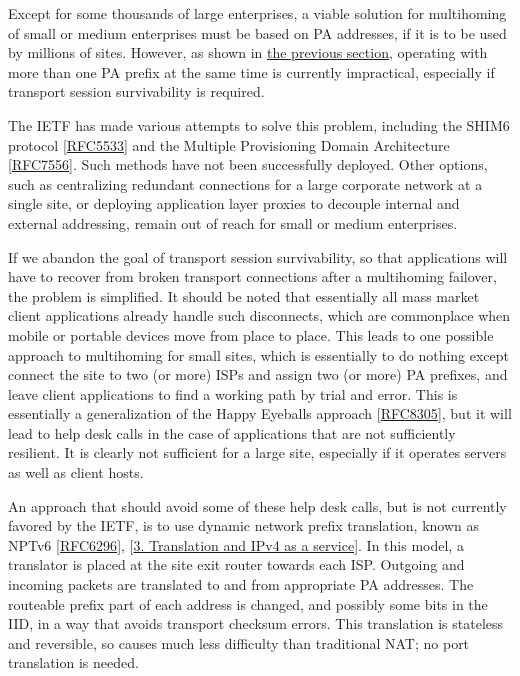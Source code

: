 \documentclass[
]{article}
\begin{document}
Except for some thousands of large enterprises, a viable solution for
multihoming of small or medium enterprises must be based on PA
addresses, if it is to be used by millions of sites. However, as shown
in \hyperref[multi-prefix-operation]{the previous section}, operating
with more than one PA prefix at the same time is currently impractical,
especially if transport session survivability is required.

The IETF has made various attempts to solve this problem, including the
SHIM6 protocol
{[}\href{https://www.rfc-editor.org/info/rfc5533}{RFC5533}{]} and the
Multiple Provisioning Domain Architecture
{[}\href{https://www.rfc-editor.org/info/rfc7556}{RFC7556}{]}. Such
methods have not been successfully deployed. Other options, such as
centralizing redundant connections for a large corporate network at a
single site, or deploying application layer proxies to decouple internal
and external addressing, remain out of reach for small or medium
enterprises.

If we abandon the goal of transport session survivability, so that
applications will have to recover from broken transport connections
after a multihoming failover, the problem is simplified. It should be
noted that essentially all mass market client applications already
handle such disconnects, which are commonplace when mobile or portable
devices move from place to place. This leads to one possible approach to
multihoming for small sites, which is essentially to do nothing except
connect the site to two (or more) ISPs and assign two (or more) PA
prefixes, and leave client applications to find a working path by trial
and error. This is essentially a generalization of the Happy Eyeballs
approach {[}\href{https://www.rfc-editor.org/info/rfc8305}{RFC8305}{]},
but it will lead to help desk calls in the case of applications that are
not sufficiently resilient. It is clearly not sufficient for a large
site, especially if it operates servers as well as client hosts.

An approach that should avoid some of these help desk calls, but is not
currently favored by the IETF, is to use dynamic network prefix
translation, known as NPTv6
{[}\href{https://www.rfc-editor.org/info/rfc6296}{RFC6296}{]},
{[}\hyperref[translation-and-ipv4-as-a-service]{3. Translation and IPv4
as a service}{]}. In this model, a translator is placed at the site exit
router towards each ISP. Outgoing and incoming packets are translated to
and from appropriate PA addresses. The routeable prefix part of each
address is changed, and possibly some bits in the IID, in a way that
avoids transport checksum errors. This translation is stateless and
reversible, so causes much less difficulty than traditional NAT; no port
translation is needed.
\end{document}
